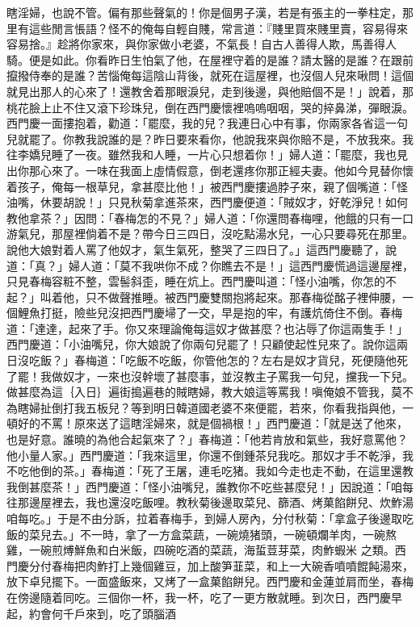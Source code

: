 瞎淫婦，也說不管。偏有那些聲氣的！你是個男子漢，若是有張主的一拳柱定，那里有這些閒言悵語？怪不的俺每自輕自賤，常言道：『賤里買來賤里賣，容易得來容易捨。』趁將你家來，與你家做小老婆，不氣長！自古人善得人欺，馬善得人騎。便是如此。你看昨日生怕氣了他，在屋裡守着的是誰？請太醫的是誰？在跟前攛撥侍奉的是誰？苦惱俺每這陰山背後，就死在這屋裡，也沒個人兒來啾問！這個就見出那人的心來了！還教舍着那眼淚兒，走到後邊，與他賠個不是！」說着，那桃花臉上止不住又滾下珍珠兒，倒在西門慶懷裡嗚嗚咽咽，哭的捽鼻涕，彈眼淚。西門慶一面摟抱着，勸道：「罷麼，我的兒？我連日心中有事，你兩家各省這一句兒就罷了。你教我說誰的是？昨日要來看你，他說我來與你賠不是，不放我來。我往李嬌兒睡了一夜。雖然我和人睡，一片心只想着你！」婦人道：「罷麼，我也見出你那心來了。一味在我面上虛情假意，倒老還疼你那正經夫妻。他如今見替你懷着孩子，俺每一根草兒，拿甚麼比他！」被西門慶摟過脖子來，親了個嘴道：「怪油嘴，休要胡說！」只見秋菊拿進茶來，西門慶便道：「賊奴才，好乾淨兒！如何教他拿茶？」因問：「春梅怎的不見？」婦人道：「你還問春梅哩，他餓的只有一口游氣兒，那屋裡倘着不是？帶今日三四日，沒吃點湯水兒，一心只要尋死在那里。說他大娘對着人罵了他奴才，氣生氣死，整哭了三四日了。」這西門慶聽了，說道：「真？」婦人道：「莫不我哄你不成？你瞧去不是！」這西門慶慌過這邊屋裡，只見春梅容粧不整，雲髻斜歪，睡在炕上。西門慶叫道：「怪小油嘴，你怎的不起？」叫着他，只不做聲推睡。被西門慶雙關抱將起來。那春梅從酩子裡伸腰，一個鯉魚打挺，險些兒沒把西門慶埽了一交，早是抱的牢，有護炕倚住不倒。春梅道：「達達，起來了手。你又來理論俺每這奴才做甚麼？也沾辱了你這兩隻手！」西門慶道：「小油嘴兒，你大娘說了你兩句兒罷了！只顧使起性兒來了。說你這兩日沒吃飯？」春梅道：「吃飯不吃飯，你管他怎的？左右是奴才貨兒，死便隨他死了罷！我做奴才，一來也沒幹壞了甚麼事，並沒教主子罵我一句兒，攩我一下兒。做甚麼為這｛入日｝遍街搗遍巷的賊瞎婦，教大娘這等罵我！嗔俺娘不管我，莫不為瞎婦扯倒打我五板兒？等到明日韓道國老婆不來便罷，若來，你看我指與他，一頓好的不罵！原來送了這瞎淫婦來，就是個禍根！」西門慶道：「就是送了他來，也是好意。誰曉的為他合起氣來了？」春梅道：「他若肯放和氣些，我好意罵他？他小量人家。」西門慶道：「我來這里，你還不倒鍾茶兒我吃。那奴才手不乾淨，我不吃他倒的茶。」春梅道：「死了王屠，連毛吃猪。我如今走也走不動，在這里還教我倒甚麼茶！」西門慶道：「怪小油嘴兒，誰教你不吃些甚麼兒！」因說道：「咱每往那邊屋裡去，我也還沒吃飯哩。教秋菊後邊取菜兒、篩酒、烤菓餡餅兒、炊鮓湯咱每吃。」于是不由分訴，拉着春梅手，到婦人房內，分付秋菊：「拿盒子後邊取吃飯的菜兒去。」不一時，拿了一方盒菜蔬，一碗燒猪頭，一碗頓爛羊肉，一碗熬雞，一碗煎煿鮮魚和白米飯，四碗吃酒的菜蔬，海蜇荳芽菜，肉鮓蝦米 之類。西門慶分付春梅把肉鮓打上幾個雞豆，加上酸笋韮菜，和上一大碗香噴噴餛飩湯來，放下卓兒擺下。一面盛飯來，又烤了一盒菓餡餅兒。西門慶和金蓮並肩而坐，春梅在傍邊隨着同吃。三個你一杯，我一杯，吃了一更方散就睡。到次日，西門慶早起，約會何千戶來到，吃了頭腦酒 
